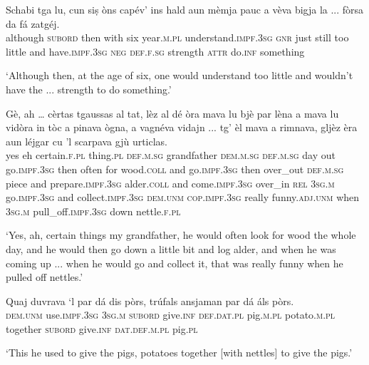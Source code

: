 \begin{linenumbers}
\gll Schabi tga lu, cun siṣ òns capév’ ins hald aun mèmja pauc a vèva bigja la ... fòrsa da fá zatgéj.   \\
although \textsc{subord} then with six year.\textsc{m.pl} understand.\textsc{impf.3sg} \textsc{gnr} just still too little and have.\textsc{impf.3sg} \textsc{neg} \textsc{def.f.sg} {} strength \textsc{attr} do.\textsc{inf} something\\
\end{linenumbers}
\medskip
\glt `Although then, at the age of six, one would understand too little and wouldn’t have the ... strength to do something.'
\medskip

\begin{linenumbers}
\gll  Gè, ah … cèrtas tgaussas al tat, lèz al dé òra mava lu bjè par lèna a mava lu vidòra in tòc a pinava ògna, a vagnéva vidajn ... tg’ èl mava a rimnava, gljèz èra aun léjgar cu ’l scarpava gjù urticlas.  \\
yes eh {} certain.\textsc{f.pl} thing.\textsc{pl} \textsc{def.m.sg} grandfather \textsc{dem.m.sg}  \textsc{def.m.sg} day out go.\textsc{impf.3sg} then often for wood.\textsc{coll} and go.\textsc{impf.3sg} then over\_out \textsc{def.m.sg} piece and prepare.\textsc{impf.3sg} alder.\textsc{coll} and come.\textsc{impf.3sg} over\_in {} \textsc{rel} \textsc{3sg.m} go.\textsc{impf.3sg} and collect.\textsc{impf.3sg} \textsc{dem.unm} \textsc{cop.impf.3sg} really funny.\textsc{adj.unm} when \textsc{3sg.m} pull\_off.\textsc{impf.3sg} down nettle.\textsc{f.pl} \\
\end{linenumbers}
\medskip
\glt `Yes, ah, certain things my grandfather, he would often look for wood the whole day, and he would then go down a little bit and log alder, and when he was coming up ... when he would go and collect it, that was really funny when he pulled off nettles.'
\medskip

\begin{linenumbers}
\gll   Quaj duvrava `l par dá dis pòrs, trúfals ansjaman par dá áls pòrs. \\
 \textsc{dem.unm} use.\textsc{impf.3sg} \textsc{3sg.m} \textsc{subord} give.\textsc{inf} \textsc{def.dat.pl} pig.\textsc{m.pl} potato.\textsc{m.pl} together \textsc{subord} give.\textsc{inf} \textsc{dat.def.m.pl} pig.\textsc{pl}\\
\end{linenumbers}
\medskip
\glt `This he used to give the pigs, potatoes together [with nettles] to give the pigs.'
\medskip

